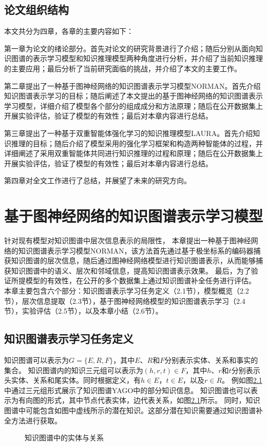 \documentclass[algorithmlist, AutoFakeBold, AutoFakeSlant, figurelist, tablelist, nomlist, engineering, openany]{seuthesix} %
\begin{document}
\section{论文组织结构}
本文共分为四章，各章的主要内容如下：

第一章为论文的绪论部分。首先对论文的研究背景进行了介绍；随后分别从面向知识图谱的表示学习模型和知识推理模型两种角度进行分析，并介绍了当前知识推理的主要应用；最后分析了当前研究面临的挑战，并介绍了本文的主要工作。

第二章提出了一种基于图神经网络的知识图谱表示学习模型NORMAN。首先介绍知识图谱表示学习的目标；随后阐述了本文提出的基于图神经网络的知识图谱表示学习模型，详细介绍了模型各个部分的组成成分和方法原理；随后在公开数据集上开展实验评估，验证了模型的有效性；最后对本章内容进行总结。

第三章提出了一种基于双重智能体强化学习的知识推理模型LAURA。首先介绍知识推理的目标；随后介绍了模型采用的强化学习框架和构造两种智能体的过程，并详细阐述了采用双重智能体共同进行知识推理的过程和原理；随后在公开数据集上开展实验评估，验证了模型的有效性；最后对本章内容进行总结。

第四章对全文工作进行了总结，并展望了未来的研究方向。


\chapter{基于图神经网络的知识图谱表示学习模型}
针对现有模型对知识图谱中层次信息表示的局限性，
本章提出一种基于图神经网络的知识图谱表示学习模型NORMAN，该方法首先通过基于极坐标系的编码器捕获知识图谱的层次信息，随后通过图神经网络模型进行知识图谱表示，从而能够捕获知识图谱中的语义、层次和邻域信息，提高知识图谱表示效果。
最后，为了验证所提模型的有效性，在公开的多个数据集上通过知识图谱补全任务进行评估。
本章主要包含六个部分：知识图谱表示学习任务定义（2.1节），模型概览（2.2节），层次信息提取（2.3节），基于图神经网络模型的知识图谱表示学习（2.4节），实验评估（2.5节），以及本章小结（2.6节）。

\section{知识图谱表示学习任务定义}
知识图谱可以表示为$G=\{E, R, F\}$，其中$E$、$R$和$F$分别表示实体、关系和事实的集合。
知识图谱内的知识三元组可以表示为$(h, r, t) \in F$，其中$h$、$r$和$t$分别表示头实体、关系和尾实体。同时根据定义，有$h \in E$，$t \in E$，以及$r \in R$。
例如图\ref{2_KG}中通过三元组形式展示了知识图谱YAGO中的部分知识信息。
知识图谱也可以表示为有向图的形式，其中节点代表实体，边代表关系，如图\ref{2_KG}所示。
同时，知识图谱中可能包含如图中虚线所示的潜在知识。这部分潜在知识需要通过知识图谱补全方法进行获取。
\begin{figure}[H]
  \centering
  \caption{知识图谱中的实体与关系}
  \label{2_KG}
\end{figure}
\end{document}
